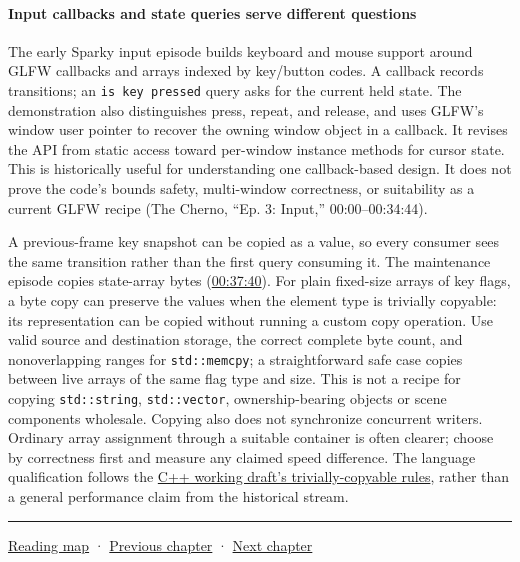 \paragraph{Input callbacks and state queries serve different questions}\label{input-callbacks-and-state-queries-serve-different-questions}

The early Sparky input episode builds keyboard and mouse support around GLFW callbacks and arrays indexed by key/button codes. A callback records transitions; an \texttt{is\ key\ pressed} query asks for the current held state. The demonstration also distinguishes press, repeat, and release, and uses GLFW's window user pointer to recover the owning window object in a callback. It revises the API from static access toward per-window instance methods for cursor state. This is historically useful for understanding one callback-based design. It does not prove the code's bounds safety, multi-window correctness, or suitability as a current GLFW recipe (The Cherno, ``Ep. 3: Input,'' 00:00--00:34:44).

A previous-frame key snapshot can be copied as a value, so every consumer sees the same transition rather than the first query consuming it. The maintenance episode copies state-array bytes (\href{https://www.youtube.com/watch?v=CKhGMoTNPOo&t=2260}{00:37:40}). For plain fixed-size arrays of key flags, a byte copy can preserve the values when the element type is trivially copyable: its representation can be copied without running a custom copy operation. Use valid source and destination storage, the correct complete byte count, and nonoverlapping ranges for \texttt{std::memcpy}; a straightforward safe case copies between live arrays of the same flag type and size. This is not a recipe for copying \texttt{std::string}, \texttt{std::vector}, ownership-bearing objects or scene components wholesale. Copying also does not synchronize concurrent writers. Ordinary array assignment through a suitable container is often clearer; choose by correctness first and measure any claimed speed difference. The language qualification follows the \href{https://eel.is/c++draft/basic.types\#basic.types.trivial}{C++ working draft's trivially-copyable rules}, rather than a general performance claim from the historical stream.

\begin{center}\rule{0.5\linewidth}{0.5pt}\end{center}

\href{Chapter\%20Edition/03\%20-\%20Game\%20Engine/00\%20-\%20Reading\%20Map}{Reading map} · \hyperref[05-engine-i-ch012]{Previous chapter} · \hyperref[05-engine-i-ch014]{Next chapter}
